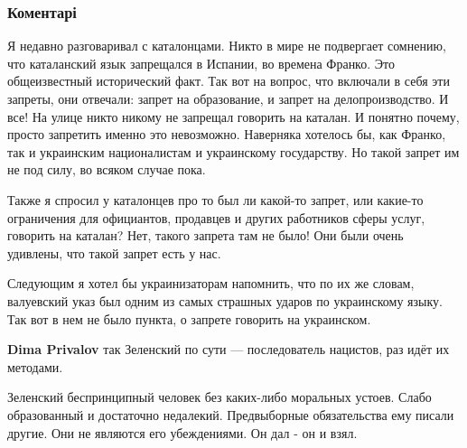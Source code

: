  
 
 
 
 
\subsubsection{Коментарі}
\label{sec:20_09_2021.fb.skubchenko_aleksandr.1.pravo_jazyk_ukraina.cmt}

\begin{itemize} %

Я недавно разговаривал с каталонцами. Никто в мире не подвергает сомнению, что
каталанский язык запрещался в Испании, во времена Франко. Это общеизвестный
исторический факт. Так вот на вопрос, что включали в себя эти запреты, они
отвечали: запрет на образование, и запрет на делопроизводство. И все! На улице
никто никому не запрещал говорить на каталан. И понятно почему, просто
запретить именно это невозможно. Наверняка хотелось бы, как Франко, так и
украинским националистам и украинскому государству. Но такой запрет им не под
силу, во всяком случае пока.

Также я спросил у каталонцев про то был ли какой-то запрет, или какие-то
ограничения для официантов, продавцев и других работников сферы услуг, говорить
на каталан? Нет, такого запрета там не было! Они были очень удивлены, что такой
запрет есть у нас.

Следующим я хотел бы украинизаторам напомнить, что по их же словам, валуевский
указ был одним из самых страшных ударов по украинскому языку. Так вот в нем не
было пункта, о запрете говорить на украинском.

\begin{itemize} %
\textbf{Dima Privalov} так Зеленский по сути — последователь нацистов, раз идёт их методами.
\end{itemize} %


Зеленский беспринципный человек без каких-либо моральных устоев. Слабо
образованный и достаточно недалекий. Предвыборные обязательства ему писали
другие. Они не являются его убеждениями. Он дал - он и взял.


\end{itemize}
